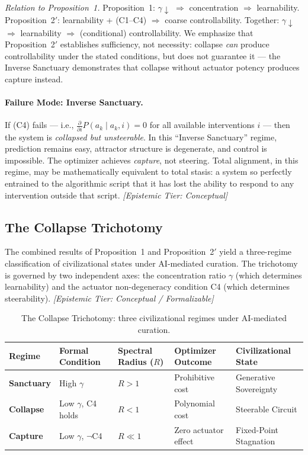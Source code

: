 \documentclass[11pt, a4paper]{article}
\theoremstyle{remark}
\begin{document}
\emph{Relation to Proposition~1.} Proposition~1: $\gamma \downarrow$ $\Rightarrow$ concentration $\Rightarrow$ learnability. Proposition~2$'$: learnability + (C1--C4) $\Rightarrow$ coarse controllability. Together: $\gamma \downarrow$ $\Rightarrow$ learnability $\Rightarrow$ (conditional) controllability. We emphasize that Proposition~2$'$ establishes sufficiency, not necessity: collapse \emph{can} produce controllability under the stated conditions, but does not guarantee it --- the Inverse Sanctuary demonstrates that collapse without actuator potency produces capture instead.

\paragraph{Failure Mode: Inverse Sanctuary.} If (C4) fails --- i.e., $\frac{\partial}{\partial i} P(a_k \mid a_k, i) = 0$ for all available interventions $i$ --- then the system is \emph{collapsed but unsteerable}. In this ``Inverse Sanctuary'' regime, prediction remains easy, attractor structure is degenerate, and control is impossible. The optimizer achieves \emph{capture}, not steering. Total alignment, in this regime, may be mathematically equivalent to total stasis: a system so perfectly entrained to the algorithmic script that it has lost the ability to respond to any intervention outside that script. \textit{[Epistemic Tier: Conceptual]}

\subsection{The Collapse Trichotomy}\label{sec:trichotomy}

The combined results of Proposition~1 and Proposition~2$'$ yield a three-regime classification of civilizational states under AI-mediated curation. The trichotomy is governed by two independent axes: the concentration ratio $\gamma$ (which determines learnability) and the actuator non-degeneracy condition C4 (which determines steerability). \textit{[Epistemic Tier: Conceptual / Formalizable]}

\begin{table}[H]
\centering
\caption{The Collapse Trichotomy: three civilizational regimes under AI-mediated curation.}
\label{tab:trichotomy}
\begin{tabularx}{\textwidth}{p{2cm} p{2cm} p{2.2cm} p{2.8cm} X}
\toprule
\textbf{Regime} & \textbf{Formal Condition} & \textbf{Spectral Radius ($R$)} & \textbf{Optimizer Outcome} & \textbf{Civilizational State} \\
\midrule
\textbf{Sanctuary} & High $\gamma$ & $R > 1$ & Prohibitive cost & Generative Sovereignty \\
\textbf{Collapse} & Low $\gamma$, C4 holds & $R < 1$ & Polynomial cost & Steerable Circuit \\
\textbf{Capture} & Low $\gamma$, $\neg$C4 & $R \ll 1$ & Zero actuator effect & Fixed-Point Stagnation \\
\bottomrule
\end{tabularx}
\end{table}
\end{document}
